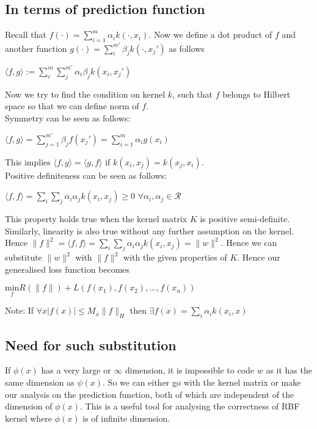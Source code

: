 \documentclass[12pt]{article}
\begin{document}
\subsection{In terms of prediction function}
Recall that $f(\cdot) = \sum_{i=1}^m \alpha_i k(\cdot,x_i)$. Now we define a dot product of $f$ and another function $g(\cdot)=\sum_i^{m'}\beta_j k(\cdot,x_j')$ as follows
\begin{center}
    $\langle f,g\rangle := \sum_{i}^m\sum_j^{m'}\alpha_i\beta_j k(x_i,x_{j}')$
\end{center}
Now we try to find the condition on kernel $k$, such that $f$ belongs to Hilbert space so that we can define norm of $f$.\\
Symmetry can be seen as follows:
\begin{center}
    $\langle f,g\rangle = \sum_{j=1}^{m'}\beta_j f(x_j ') = \sum_{i=1}^m\alpha_i g(x_i)$
\end{center}
This implies $\langle f,g\rangle = \langle g,f \rangle$ if $k(x_i,x_j) = k(x_j,x_i)$.\\
Positive definiteness can be seen as follows:
\begin{center}
    $\langle f,f\rangle = \sum_{i}\sum_{j}\alpha_i\alpha_j k(x_i,x_j)\geq 0$ $\forall\alpha_i,\alpha_j\in\mathcal{R}$
\end{center}
This property holds true when the kernel matrix $K$ is positive semi-definite.\\
Similarly, linearity is also true without any further assumption on the kernel. Hence $\|f\|^2 = \langle f,f\rangle  = \sum_{i}\sum_{j}\alpha_i\alpha_j k(x_i,x_j) = \|w\|^2$. Hence we can substitute $\|w\|^2$ with $\|f\|^2$ with the given properties of $K$. Hence our generalised loss function becomes
\begin{center}
    $\underset{f}{\text{min}}  R(\|f\|) + L(f(x_1),f(x_2),...,f(x_n))$
\end{center}
Note: If $\forall x |f(x)|\leq M_x\|f\|_H$ then $\exists f(x)=\sum_{i}\alpha_ik(x_i,x)$
\subsection{Need for such substitution}
If $\phi(x)$ has a very large or $\infty$ dimension, it is impossible to code $w$ as it has the same dimension as $\psi(x)$. So we can either go with the kernel matrix or make our analysis on the prediction function, both of which are independent of the dimension of $\phi(x)$. This is a useful tool for analysing the correctness of RBF kernel where $\phi(x)$ is of infinite dimension.
\end{document}

